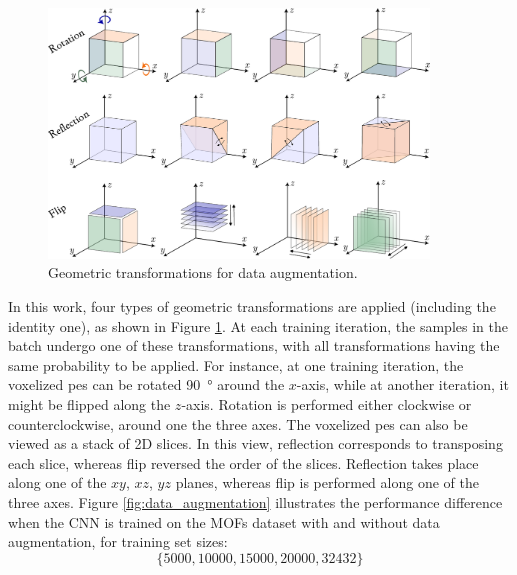 \begin{figure}
	\centering
	\includegraphics[width=0.9\textwidth]{fig/transformations.pdf}
	\caption{Geometric transformations for data
	augmentation.}
	\label{fig:transformations}
\end{figure}

In this work, four types of geometric transformations are applied (including the
identity one), as shown in Figure \ref{fig:transformations}. At each training
iteration, the samples in the batch undergo one of these transformations, with
all transformations having the same probability to be applied. For instance, at
one training iteration, the voxelized \gls{pes} can be rotated
\SI{90}{\degree} around the $x$-axis, while at another iteration, it might be
flipped along the $z$-axis. Rotation is performed either
clockwise or counterclockwise, around one the three axes. The voxelized \gls{pes}
can also be viewed as a stack of 2D slices. In this view,
reflection corresponds to transposing each slice, whereas flip
reversed the order of the slices. Reflection takes place along one of the $xy$,
$xz$, $yz$ planes, whereas flip is performed along one of the three axes.
Figure \ref{fig:data_augmentation} illustrates the performance difference when
the CNN is trained on the MOFs dataset with and without data augmentation, for
training set sizes:
\begin{equation}
	\{
		\num{5000}, \num{10000},
		\num{15000}, \num{20000},
		\num{32432}
	\}
\end{equation}


